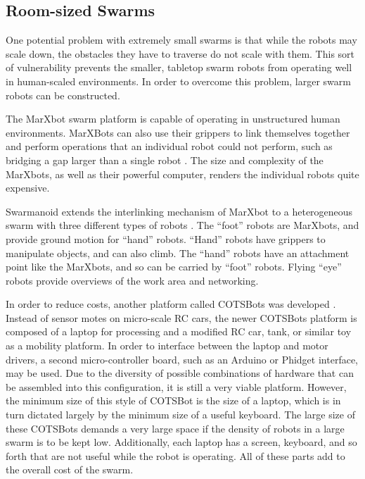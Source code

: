 \subsection{Room-sized Swarms} \label{section:Room_sized_Swarms}

One potential problem with extremely small swarms is that while the robots may scale down, the obstacles they have to traverse do not scale with them. 
This sort of vulnerability prevents the smaller, tabletop swarm robots from operating well in human-scaled environments. 
In order to overcome this problem, larger swarm robots can be constructed.
 
The MarXbot swarm platform is capable of operating in unstructured human environments. 
MarXBots can also use their grippers to link themselves together and perform operations that an individual robot could not perform, such as bridging a gap larger than a single robot \citep{bonani2010marxbot}. 
The size and complexity of the MarXbots, as well as their powerful computer, renders the individual robots quite expensive. 

Swarmanoid extends the interlinking mechanism of MarXbot to a heterogeneous swarm with three different types of robots \citep{dorigo2013swarmanoid}.
The ``foot'' robots are MarXbots, and provide ground motion for ``hand'' robots. 
``Hand'' robots have grippers to manipulate objects, and can also climb.
The ``hand'' robots have an attachment point like the MarXbots, and so can be carried by ``foot'' robots. 
Flying ``eye'' robots provide overviews of the work area and networking.  

In order to reduce costs, another platform called COTSBots was developed \citep{soule2011cotsbots}.  
Instead of sensor motes on micro-scale RC cars, the newer COTSBots platform is composed of a laptop for processing and a modified RC car, tank, or similar toy as a mobility platform.
In order to interface between the laptop and motor drivers, a second micro-controller board, such as an Arduino or Phidget interface, may be used. 
Due to the diversity of possible combinations of hardware that can be assembled into this configuration, it is still a very viable platform. 
However, the minimum size of this style of COTSBot is the size of a laptop, which is in turn dictated largely by the minimum size of a useful keyboard. 
The large size of these COTSBots demands a very large space if the density of robots in a large swarm is to be kept low. 
Additionally, each laptop has a screen, keyboard, and so forth that are not useful while the robot is operating. 
All of these parts add to the overall cost of the swarm. 

